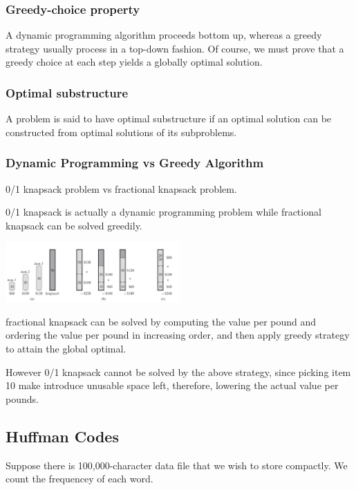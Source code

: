     \subsubsection*{Greedy-choice property}

    A dynamic programming algorithm proceeds bottom up, whereas a greedy 
    strategy usually process in a top-down fashion.
    Of course, we must prove that a greedy choice at each step yields a globally
    optimal solution.

    \subsubsection*{Optimal substructure}

    A problem is said to have optimal substructure 
    if an optimal solution can be constructed from optimal solutions 
    of its subproblems.

    \subsubsection*{Dynamic Programming vs Greedy Algorithm}

    0/1 knapsack problem vs fractional knapsack problem.

    0/1 knapsack is actually a dynamic programming problem while 
    fractional knapsack can be solved greedily.

    \includegraphics[width=0.5\textwidth]{contents/Advanced_Design/Greedy/greedy_image/dp_vs_greedy.png}

    fractional knapsack can be solved by computing the value per pound and 
    ordering the value per pound in increasing order, and then apply 
    greedy strategy to attain the global optimal.

    However 0/1 knapsack cannot be solved by the above strategy, since 
    picking item 10 make introduce unusable space left, therefore, lowering 
    the actual value per pounds.


\subsection{Huffman Codes}

    Suppose there is 100,000-character data file that we wish 
    to store compactly. We count the frequencey of each word.

